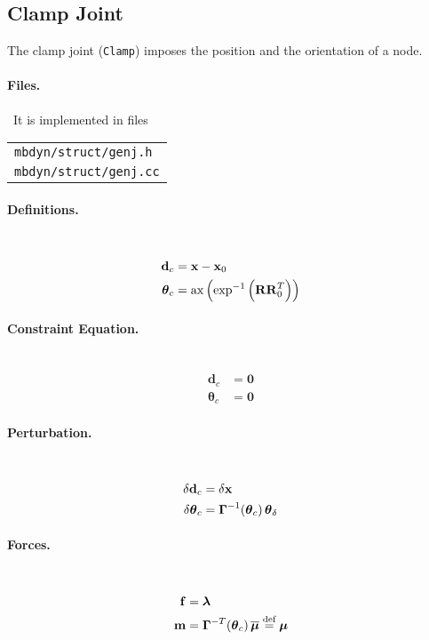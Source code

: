 \documentclass[10pt,dvips,fleqn,subeqn]{report}
\newcommand{\T}[1]{\bm{\mathbf{#1}}}
\newcommand{\TT}[1]{\bm{\mathbf{#1}}}
\begin{document}
\subsection{Clamp Joint}
\label{sec:ClampJoint}
The clamp joint (\texttt{Clamp}) imposes the position
and the orientation of a node.

\paragraph{Files.} \
It is implemented in files

\begin{tabular}{l}
\texttt{mbdyn/struct/genj.h} \\
\texttt{mbdyn/struct/genj.cc}
\end{tabular}

\paragraph{Definitions.} \
\begin{align}
	\T{d}_c &= \T{x} - \T{x}_0 \\
	\T{\theta}_c &= \mathrm{ax}\plbr{\mathrm{exp}^{-1}\plbr{\TT{R}\TT{R}_0^T}}
\end{align}

\paragraph{Constraint Equation.} \
\begin{align}
	\T{d}_c &= \T{0} \\
	\T{\theta}_c &= \T{0}
\end{align}

\paragraph{Perturbation.} \
\begin{align}
	\delta\T{d}_c &= \delta\T{x} \\
	\delta\T{\theta}_c &= \TT{\Gamma}^{-1}\!\plbr{\T{\theta}_c} \T{\theta}_{\delta}
\end{align}

\paragraph{Forces.} \
\begin{subequations}
\begin{align}
	\T{f} &= \T{\lambda} \\
	\T{m} &= \TT{\Gamma}^{-T}\!\plbr{\T{\theta}_c} \overline{\T{\mu}}
	\overset{\text{def}}{=} \T{\mu}
\end{align}
\end{subequations}
\end{document}
